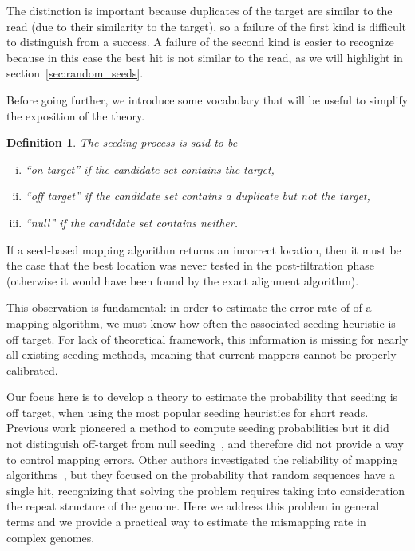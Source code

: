 \documentclass{article}
\newtheorem{definition}{Definition}
\begin{document}
The distinction is important because duplicates of the target are similar
to the read (due to their similarity to the target), so a failure of the
first kind is difficult to distinguish from a success. A failure of the
second kind is easier to recognize because in this case the best hit is
not similar to the read, as we will highlight in
section~\ref{sec:random_seeds}.

Before going further, we introduce some vocabulary that will be useful to
simplify the exposition of the theory.

\begin{definition}
The seeding process is said to be
\begin{enumerate}[i)]
\item ``on target'' if the candidate set contains the target,
\item ``off target'' if the candidate set contains a duplicate but
not the target, 
\item ``null'' if the candidate set contains neither.
\end{enumerate}
\end{definition}

If a seed-based mapping algorithm returns an incorrect location, then it
must be the case that the best location was never tested in the
post-filtration phase (otherwise it would have been found by the exact
alignment algorithm).

This observation is fundamental: in order to estimate the error rate of of
a mapping algorithm, we must know how often the associated seeding
heuristic is off target. For lack of theoretical framework, this
information is missing for nearly all existing seeding methods, meaning
that current mappers cannot be properly calibrated.

Our focus here is to develop a theory to estimate the probability that
seeding is off target, when using the most popular seeding heuristics for
short reads. Previous work pioneered a method to compute seeding
probabilities but it did not distinguish off-target from null
seeding~\cite{filion2017analytic,filion2018analytic}, and therefore did
not provide a way to control mapping errors. Other authors investigated
the reliability of mapping algorithms~\cite{pmid23872968}, but they
focused on the probability that random sequences have a single hit,
recognizing that solving the problem requires taking into consideration
the repeat structure of the genome. Here we address this problem in
general terms and we provide a practical way to estimate the mismapping
rate in complex genomes.
\end{document}
